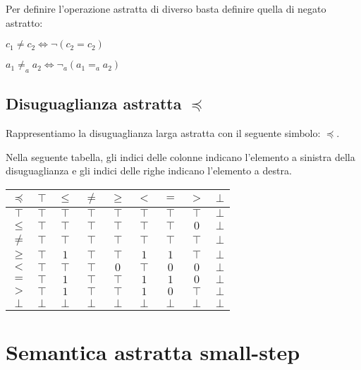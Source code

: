 Per definire l'operazione astratta di diverso basta definire quella di negato astratto:
\begin{center}
	$ c_1 \neq c_2 \iff \neg (c_2 = c_2) $
\end{center}

\begin{center}
	$ a_1 \neq _a a_2 \iff \neg _a (a_1 =_a a_2) $
\end{center}

\subsection{Disuguaglianza astratta $\preceq$}

Rappresentiamo la disuguaglianza larga astratta con il seguente simbolo: $\preceq$.

Nella seguente tabella, gli indici delle colonne indicano l'elemento a sinistra della disuguaglianza e gli indici delle righe indicano l'elemento a destra.

\begin{center}
	\begin{tabular}{| c | c | c | c | c | c | c | c | c | }
		\hline
		$\preceq$ & $\top$ & $\leq$ & $\neq$ & $\geq$ & $<$ & $=$ & $>$ & $\bot$ \\
		\hline
		$\top$ & $\top$ & $\top$ & $\top$ & $\top$ & $\top$ & $\top$ & $\top$ & $\bot$\\
		\hline
		$\leq$ & $\top$ & $\top$ & $\top$ & $\top$ & $\top$ & $\top$ & $0$ & $\bot$\\
		\hline
		$\neq$ & $\top$ & $\top$ & $\top$ & $\top$ & $\top$ & $\top$ & $\top$ & $\bot$\\
		\hline
		$\geq$ & $\top$ & $1$ & $\top$ & $\top$ & $1$ & $1$ & $\top$ & $\bot$ \\
		\hline
		$<$ & $\top$ & $\top$ & $\top$ & $0$ & $\top$ & $0$ & $0$ & $\bot$\\
		\hline
		$=$ & $\top$ & $1$ & $\top$ & $\top$ & $1$ & $1$ & $0$ & $\bot$ \\
		\hline
		$>$ & $\top$ & $1$ & $\top$ & $\top$ & $1$ & $0$ & $\top$ & $\bot$ \\
		\hline
		$\bot$ & $\bot$ & $\bot$ & $\bot$ & $\bot$ & $\bot$ & $\bot$ & $\bot$ & $\bot$\\
		\hline
	\end{tabular}
\end{center}

\section{Semantica astratta small-step}

